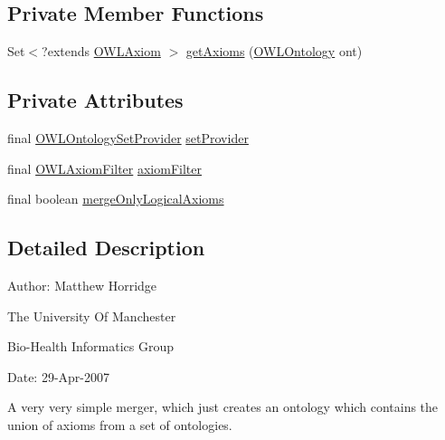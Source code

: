 \subsection*{Private Member Functions}
\begin{DoxyCompactItemize}
\item 
Set$<$?extends \hyperlink{interfaceorg_1_1semanticweb_1_1owlapi_1_1model_1_1_o_w_l_axiom}{O\-W\-L\-Axiom} $>$ \hyperlink{classorg_1_1semanticweb_1_1owlapi_1_1util_1_1_o_w_l_ontology_merger_a7ac91fbeb858581bb260e6513f2f0141}{get\-Axioms} (\hyperlink{interfaceorg_1_1semanticweb_1_1owlapi_1_1model_1_1_o_w_l_ontology}{O\-W\-L\-Ontology} ont)
\end{DoxyCompactItemize}
\subsection*{Private Attributes}
\begin{DoxyCompactItemize}
\item 
final \hyperlink{interfaceorg_1_1semanticweb_1_1owlapi_1_1model_1_1_o_w_l_ontology_set_provider}{O\-W\-L\-Ontology\-Set\-Provider} \hyperlink{classorg_1_1semanticweb_1_1owlapi_1_1util_1_1_o_w_l_ontology_merger_a43e29f791c8384993cba9ffc61390c0b}{set\-Provider}
\item 
final \hyperlink{interfaceorg_1_1semanticweb_1_1owlapi_1_1util_1_1_o_w_l_axiom_filter}{O\-W\-L\-Axiom\-Filter} \hyperlink{classorg_1_1semanticweb_1_1owlapi_1_1util_1_1_o_w_l_ontology_merger_aeda588ad8f414ac7d785f53d5c3a59dd}{axiom\-Filter}
\item 
final boolean \hyperlink{classorg_1_1semanticweb_1_1owlapi_1_1util_1_1_o_w_l_ontology_merger_afbd869e4ce6ccd3aa4bb0692c7f2c7b4}{merge\-Only\-Logical\-Axioms}
\end{DoxyCompactItemize}


\subsection{Detailed Description}
Author\-: Matthew Horridge\par
 The University Of Manchester\par
 Bio-\/\-Health Informatics Group\par
 Date\-: 29-\/\-Apr-\/2007\par
\par
 

A very very simple merger, which just creates an ontology which contains the union of axioms from a set of ontologies. 

